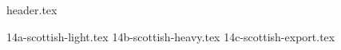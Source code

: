 \clearpage
{}
\divisorLine
{header.tex}
\begin{multicols*}{2}
{14a-scottish-light.tex}
{14b-scottish-heavy.tex}
{14c-scottish-export.tex}
\end{multicols*}